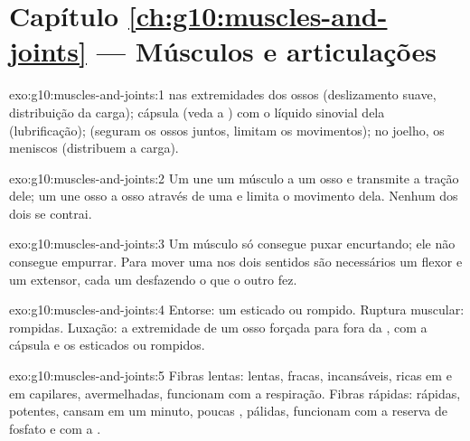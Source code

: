 \section*{Capítulo \ref{ch:g10:muscles-and-joints} --- Músculos e articulações}

\begin{solution}{exo:g10:muscles-and-joints:1}
 nas extremidades dos ossos (deslizamento suave, distribuição
da carga); cápsula (veda a ) com o líquido sinovial dela
(lubrificação);  (seguram os ossos juntos, limitam os
movimentos); no joelho, os meniscos (distribuem a carga).
\end{solution}

\begin{solution}{exo:g10:muscles-and-joints:2}
Um  une um músculo a um osso e transmite a tração dele; um
 une osso a osso através de uma  e limita o
movimento dela. Nenhum dos dois se contrai.
\end{solution}

\begin{solution}{exo:g10:muscles-and-joints:3}
Um músculo só consegue puxar encurtando; ele não consegue empurrar.
Para mover uma  nos dois sentidos são necessários um flexor
e um extensor, cada um desfazendo o que o outro fez.
\end{solution}

\begin{solution}{exo:g10:muscles-and-joints:4}
Entorse: um  esticado ou rompido. Ruptura muscular:  rompidas. Luxação: a extremidade de um osso forçada para
fora da , com a cápsula e os  esticados ou
rompidos.
\end{solution}

\begin{solution}{exo:g10:muscles-and-joints:5}
Fibras lentas: lentas, fracas, incansáveis, ricas em  e em
capilares, avermelhadas, funcionam com a respiração. Fibras rápidas:
rápidas, potentes, cansam em um minuto, poucas , pálidas,
funcionam com a reserva de fosfato e com a .
\end{solution}


